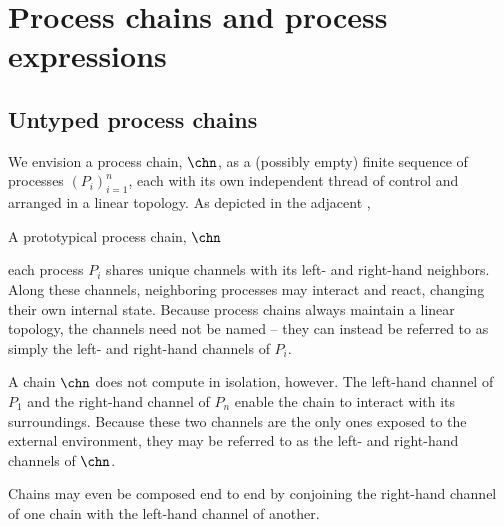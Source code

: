 \section{Process chains and process expressions}

\subsection{Untyped process chains}

We envision a process chain, $\chn$, as a (possibly empty) finite sequence of processes $(P_i)_{i=1}^{n}$, each with its own independent thread of control and arranged in a linear topology.
As depicted in the adjacent ,%
%
\begin{marginfigure}
  \centering
  \caption{A prototypical process chain, $\chn$}\label{fig:singleton-processes:chain-topology}
\end{marginfigure}
%
each process $P_i$ shares unique channels with its left- and right-hand neighbors.
Along these channels, neighboring processes may interact and react, changing their own internal state.
Because process chains always maintain a linear topology, the channels need not be named -- they can instead be referred to as simply the left- and right-hand channels of $P_i$.

A chain $\chn$ does not compute in isolation, however.
The left-hand channel of $P_1$ and the right-hand channel of $P_n$ enable the chain to interact with its surroundings.
Because these two channels are the only ones exposed to the external environment, they may be referred to as the left- and right-hand channels of $\chn$.

Chains may even be composed end to end by conjoining the right-hand channel of one chain with the left-hand channel of another.

